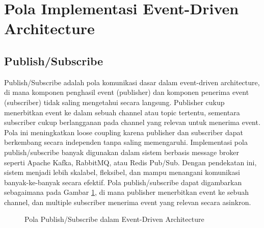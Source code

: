 \section{Pola Implementasi Event-Driven Architecture}

\subsection{Publish/Subscribe}
Publish/Subscribe adalah pola komunikasi dasar dalam event-driven architecture, di mana komponen penghasil event (publisher) dan komponen penerima event (subscriber) tidak saling mengetahui secara langsung. Publisher cukup menerbitkan event ke dalam sebuah channel atau topic tertentu, sementara subscriber cukup berlangganan pada channel yang relevan untuk menerima event. Pola ini meningkatkan loose coupling karena publisher dan subscriber dapat berkembang secara independen tanpa saling memengaruhi. Implementasi pola publish/subscribe banyak digunakan dalam sistem berbasis message broker seperti Apache Kafka, RabbitMQ, atau Redis Pub/Sub. Dengan pendekatan ini, sistem menjadi lebih skalabel, fleksibel, dan mampu menangani komunikasi banyak-ke-banyak secara efektif. Pola publish/subscribe dapat digambarkan sebagaimana pada Gambar \ref{fig:publish-subscribe}, di mana publisher menerbitkan event ke sebuah channel, dan multiple subscriber menerima event yang relevan secara asinkron.

\begin{figure}[h]
	\centering
	\caption{Pola Publish/Subscribe dalam Event-Driven Architecture}
	\label{fig:publish-subscribe}
\end{figure}


